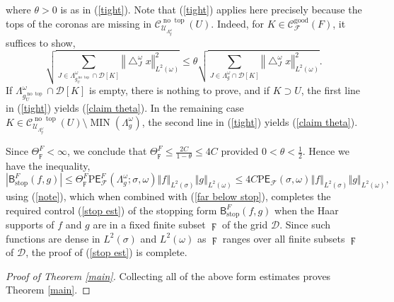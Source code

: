 \documentclass{amsart}%
\theoremstyle{plain}
\numberwithin{equation}{section}
\begin{document}
where $\theta>0$ is as in (\ref{tight}). Note that (\ref{tight}) applies here
precisely because the tops of the coronas are missing in $\mathcal{C}%
_{\mathcal{U}_{\Lambda_{g}^{\omega}}}^{\operatorname*{no}\operatorname{top}%
}\left(  U\right)  $. Indeed, for $K\in\mathcal{C}_{\mathcal{F}}%
^{\operatorname{good}}\left(  F\right)  $, it suffices to show,%
\begin{equation}
\sqrt{\sum_{J\in\Lambda_{g_{U}^{\operatorname*{no}\operatorname{top}}}%
^{\omega}\cap\mathcal{D}\left[  K\right]  }\left\Vert \bigtriangleup
_{J}^{\omega}x\right\Vert _{L^{2}\left(  \omega\right)  }^{2}}\leq\theta
\sqrt{\sum_{J\in\Lambda_{g}^{\omega}\cap\mathcal{D}\left[  K\right]
}\left\Vert \bigtriangleup_{J}^{\omega}x\right\Vert _{L^{2}\left(
\omega\right)  }^{2}}.\label{claim theta}%
\end{equation}
If $\Lambda_{g_{U}^{\operatorname*{no}\operatorname{top}}}^{\omega}%
\cap\mathcal{D}\left[  K\right]  $ is empty, there is nothing to prove, and if
$K\supset U$, the first line in (\ref{tight}) yields (\ref{claim theta}). In
the remaining case $K\in\mathcal{C}_{\mathcal{U}_{\Lambda_{g}^{\omega}}%
}^{\operatorname*{no}\operatorname{top}}\left(  U\right)  \setminus
\operatorname{MIN}\left(  \Lambda_{g}^{\omega}\right)  $, the second line in
(\ref{tight}) yields (\ref{claim theta}).

Since $\Theta_{\digamma}^{F}<\infty$, we conclude that $\Theta_{\digamma}%
^{F}\leq\frac{2C}{1-\theta}\leq4C$ provided $0<\theta<\frac{1}{2}$. Hence we
have the inequality,%
\[
\left\vert \mathsf{B}_{\operatorname*{stop}}^{F}\left(  f,g\right)
\right\vert \leq\Theta_{\digamma}^{F}\mathrm{P}\mathsf{E}_{\mathcal{F}}%
^{F}\left(  \Lambda_{g}^{\omega};\sigma,\omega\right)  \left\Vert f\right\Vert
_{L^{2}(\sigma)}\left\Vert g\right\Vert _{L^{2}(\omega)}\leq4C\mathrm{P}%
\mathsf{E}_{\mathcal{F}}\left(  \sigma,\omega\right)  \left\Vert f\right\Vert
_{L^{2}(\sigma)}\left\Vert g\right\Vert _{L^{2}(\omega)},
\]
using (\ref{note}), which when combined with (\ref{far below stop}), completes
the required control (\ref{stop est}) of the stopping form $\mathsf{B}%
_{\operatorname*{stop}}^{F}\left(  f,g\right)  $ when the Haar supports of $f$
and $g$ are in a fixed finite subset $\digamma$ of the grid $\mathcal{D} $.
Since such functions are dense in $L^{2}\left(  \sigma\right)  $ and
$L^{2}\left(  \omega\right)  $ as $\digamma$ ranges over all finite subsets
$\digamma$ of $\mathcal{D}$, the proof of (\ref{stop est}) is complete.

\begin{proof}
[Proof of Theorem \ref{main}]Collecting all of the above form estimates proves
Theorem \ref{main}.
\end{proof}
\end{document}
